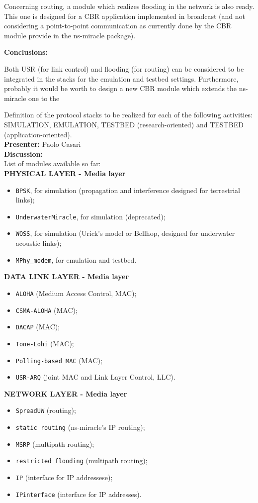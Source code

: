 \documentclass[11pt,journal,draftclsnofoot,onecolumn,twoside,letterpaper]{IEEEtran}
\theoremstyle{definition} \newtheorem{definition}[]{Definition}
\theoremstyle{theorem} \newtheorem{theorem}[]{Theorem}
\begin{document}
Concerning routing, a module which realizes flooding in the network is also ready. This one is designed for a CBR application implemented in broadcast (and not considering a point-to-point communication as currently done by the CBR module provide in the ns-miracle package).

{\bf Conclusions:} 

Both USR (for link control) and flooding (for routing) can be considered to be integrated in the stacks for the emulation and testbed settings. Furthermore, probably it would be worth to design a new CBR module which extends the ns-miracle one to the  
 
\vspace{0.5cm}

 Definition of the protocol stacks to be realized for each of the following activities: SIMULATION, EMULATION, TESTBED (research-oriented) and TESTBED (application-oriented).\\
{\bf Presenter:} Paolo Casari\\
{\bf Discussion:} \\
List of modules available so far:\\
{\bf PHYSICAL LAYER - Media layer}
   \begin{itemize}
    \item {\tt BPSK}, for simulation (propagation and interference designed for terrestrial links);
    \item {\tt UnderwaterMiracle}, for simulation (deprecated);
    \item {\tt WOSS}, for simulation (Urick's model or Bellhop, designed for underwater acoustic links);
    \item {\tt MPhy\_modem}, for emulation and testbed.
   \end{itemize}
{\bf DATA LINK LAYER - Media layer}
  \begin{itemize}
    \item {\tt ALOHA} (Medium Access Control, MAC);
    \item {\tt CSMA-ALOHA} (MAC);
    \item {\tt DACAP} (MAC);
    \item {\tt Tone-Lohi} (MAC);
    \item {\tt Polling-based MAC} (MAC);
    \item {\tt USR-ARQ} (joint MAC and Link Layer Control, LLC).
   \end{itemize}
{\bf NETWORK LAYER - Media layer}
   \begin{itemize}
     \item {\tt SpreadUW} (routing);
     \item {\tt static routing} (ns-miracle's IP routing);
     \item {\tt MSRP} (multipath routing);
     \item {\tt restricted flooding} (multipath routing);
     \item {\tt IP} (interface for IP addressese);
     \item {\tt IPinterface} (interface for IP addresses).
   \end{itemize}
\end{document}

